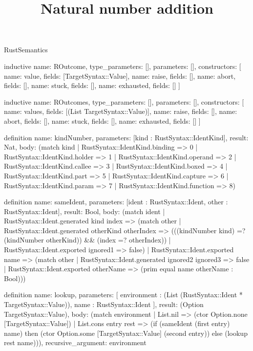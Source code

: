 \begin{lexlean}{RustSemantics}
\title{Natural number addition}
\begin{semanticmodule}
inductive{
  name: ROutcome,
  type_parameters: [],
  parameters: [],
  constructors: [
    {name: value, fields: [TargetSyntax::Value]},
    {name: raise, fields: []},
    {name: abort, fields: []},
    {name: stuck, fields: []},
    {name: exhausted, fields: []}
  ]
}

inductive{
  name: ROutcomes,
  type_parameters: [],
  parameters: [],
  constructors: [
    {name: values, fields: [(List TargetSyntax::Value)]},
    {name: raise, fields: []},
    {name: abort, fields: []},
    {name: stuck, fields: []},
    {name: exhausted, fields: []}
  ]
}

definition{
  name: kindNumber,
  parameters: [kind : RustSyntax::IdentKind],
  result: Nat,
  body: (match kind
    | RustSyntax::IdentKind.binding => 0
    | RustSyntax::IdentKind.holder => 1
    | RustSyntax::IdentKind.operand => 2
    | RustSyntax::IdentKind.callee => 3
    | RustSyntax::IdentKind.boxed => 4
    | RustSyntax::IdentKind.part => 5
    | RustSyntax::IdentKind.capture => 6
    | RustSyntax::IdentKind.param => 7
    | RustSyntax::IdentKind.function => 8)
}

definition{
  name: sameIdent,
  parameters: [ident : RustSyntax::Ident, other : RustSyntax::Ident],
  result: Bool,
  body: (match ident
    | RustSyntax::Ident.generated kind index => (match other
      | RustSyntax::Ident.generated otherKind otherIndex => (((kindNumber kind) =? (kindNumber otherKind)) && (index =? otherIndex))
      | RustSyntax::Ident.exported ignored1 => false)
    | RustSyntax::Ident.exported name => (match other
      | RustSyntax::Ident.generated ignored2 ignored3 => false
      | RustSyntax::Ident.exported otherName => (prim equal name otherName : Bool)))
}

definition{
  name: lookup,
  parameters: [
    environment : (List (RustSyntax::Ident * TargetSyntax::Value)),
    name : RustSyntax::Ident
  ],
  result: (Option TargetSyntax::Value),
  body: (match environment
    | List.nil => (ctor Option.none [TargetSyntax::Value])
    | List.cons entry rest => (if (sameIdent (first entry) name) then (ctor Option.some [TargetSyntax::Value] (second entry)) else (lookup rest name))),
  recursive_argument: environment
}


\end{semanticmodule}
\end{lexlean}
